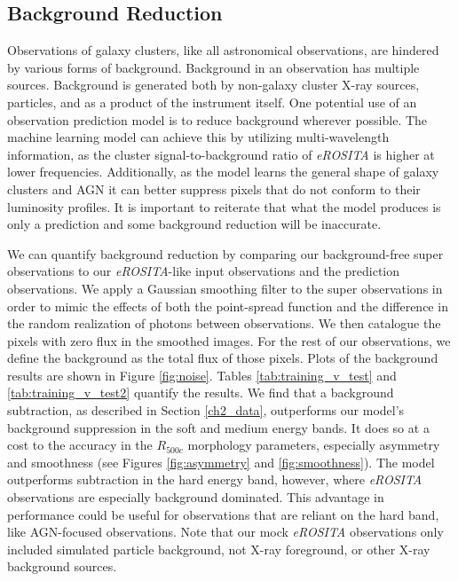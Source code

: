 \subsection{Background Reduction}\label{background reduction}
Observations of galaxy clusters, like all astronomical observations, are hindered by various forms of background. Background in an observation has multiple sources. Background is generated both by non-galaxy cluster X-ray sources, particles, and as a product of the instrument itself. One potential use of an observation prediction model is to reduce background wherever possible. The machine learning model can achieve this by utilizing multi-wavelength information, as the cluster signal-to-background ratio of \textit{eROSITA} is higher at lower frequencies. Additionally, as the model learns the general shape of galaxy clusters and AGN it can better suppress pixels that do not conform to their luminosity profiles. It is important to reiterate that what the model produces is only a prediction and some background reduction will be inaccurate.

We can quantify background reduction by comparing our background-free super observations to our \textit{eROSITA}-like input observations and the prediction observations. We apply a Gaussian smoothing filter to the super observations in order to mimic the effects of both the point-spread function and the difference in the random realization of photons between observations. We then catalogue the pixels with zero flux in the smoothed images. For the rest of our observations, we define the background as the total flux of those pixels. Plots of the background results are shown in Figure \ref{fig:noise}. Tables \ref{tab:training_v_test} and \ref{tab:training_v_test2} quantify the results. 
We find that a background subtraction, as described in Section \ref{ch2_data}, outperforms our model's background suppression in the soft and medium energy bands. It does so at a cost to the accuracy in the $R_{500c}$ morphology parameters, especially asymmetry and smoothness (see Figures \ref{fig:asymmetry} and \ref{fig:smoothness}). The model outperforms subtraction in the hard energy band, however, where \textit{eROSITA} observations are especially background dominated. This advantage in performance could be useful for observations that are reliant on the hard band, like AGN-focused observations. Note that our mock \textit{eROSITA} observations only included simulated particle background, not X-ray foreground, or other X-ray background sources.

